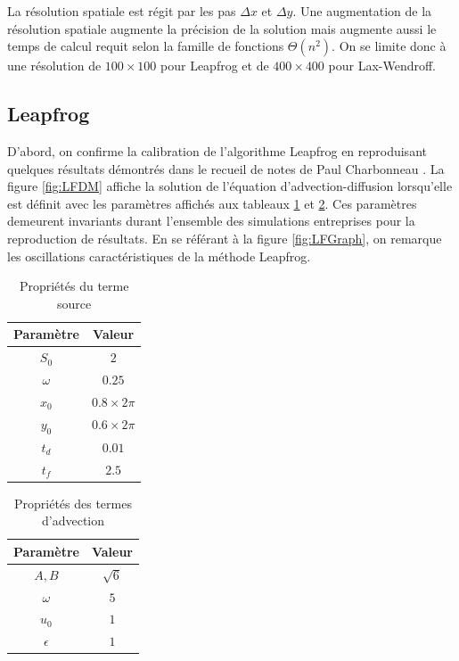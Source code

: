 \documentclass{article}
\begin{document}
La résolution spatiale est régit par les pas $\Delta x$ et $\Delta y$. Une augmentation de la résolution spatiale augmente la précision de la solution mais augmente aussi le temps de calcul requit selon la famille de fonctions $\Theta (n^2)$. On se limite donc à une résolution de $100 \times 100$ pour Leapfrog et de $400 \times 400$ pour Lax-Wendroff.

\subsection{Leapfrog}\label{sec:Leapfrog}

D'abord, on confirme la calibration de l'algorithme Leapfrog en reproduisant quelques résultats démontrés dans le recueil de notes de Paul Charbonneau \cite{notes_cours}. La figure \ref{fig:LFDM} affiche la solution de l'équation d'advection-diffusion lorsqu'elle est définit avec les paramètres affichés aux tableaux \ref{tab:prop_source} et \ref{tab:prop_adv}. Ces paramètres demeurent invariants durant l'ensemble des simulations entreprises pour la reproduction de résultats. En se référant à la figure \ref{fig:LFGraph}, on remarque les oscillations caractéristiques de la méthode Leapfrog.

\begin{table}[H]
	\centering
	\caption{Propriétés du terme source}
	\label{tab:prop_source}
	\begin{tabular}{|c|c|}
		\hline
		Paramètre & Valeur\\\hline
		$S_0$ & $2$\\
		$\omega$ & $0.25$\\
		$x_0$ & $0.8 \times 2\pi$\\
		$y_0$ & $0.6 \times 2\pi$\\	
		$t_d$ & $0.01$\\
		$t_f$ & $2.5$\\\hline
	\end{tabular}
\end{table}

\begin{table}[H]
	\centering
	\caption{Propriétés des termes d'advection}
	\label{tab:prop_adv}
	\begin{tabular}{|c|c|}
		\hline
		Paramètre & Valeur\\\hline
		$A, B$ & $\sqrt{6}$\\
		$\omega$ & $5$\\
		$u_0$ & $1$\\
		$\epsilon$ & $1$\\\hline
	\end{tabular}
\end{table}
\end{document}
